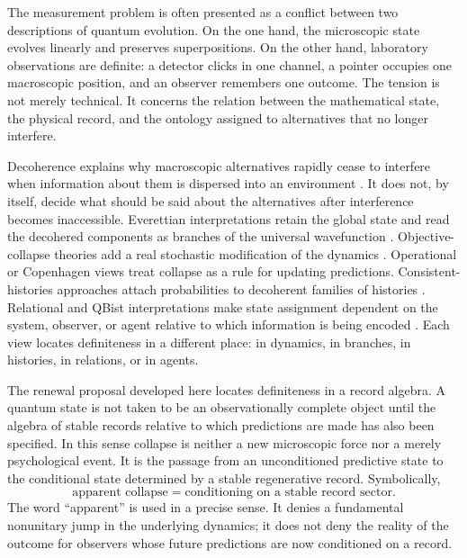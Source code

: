 \documentclass[11pt]{article}
\numberwithin{equation}{section}
\theoremstyle{definition}
\theoremstyle{remark}
\begin{document}
The measurement problem is often presented as a conflict between two descriptions of quantum evolution.  On the one hand, the microscopic state evolves linearly and preserves superpositions.  On the other hand, laboratory observations are definite: a detector clicks in one channel, a pointer occupies one macroscopic position, and an observer remembers one outcome.  The tension is not merely technical.  It concerns the relation between the mathematical state, the physical record, and the ontology assigned to alternatives that no longer interfere.

Decoherence explains why macroscopic alternatives rapidly cease to interfere when information about them is dispersed into an environment \cite{Zeh1970,Zurek1981,JoosZeh1985,Schlosshauer2007}.  It does not, by itself, decide what should be said about the alternatives after interference becomes inaccessible.  Everettian interpretations retain the global state and read the decohered components as branches of the universal wavefunction \cite{Everett1957,DeWittGraham1973,Wallace2012}.  Objective-collapse theories add a real stochastic modification of the dynamics \cite{GRW1986,Pearle1989,BassiGhirardi2003}.  Operational or Copenhagen views treat collapse as a rule for updating predictions.  Consistent-histories approaches attach probabilities to decoherent families of histories \cite{Griffiths1984,Omnes1992,GellMannHartle1993}.  Relational and QBist interpretations make state assignment dependent on the system, observer, or agent relative to which information is being encoded \cite{Rovelli1996,FuchsMerminSchack2014}.  Each view locates definiteness in a different place: in dynamics, in branches, in histories, in relations, or in agents.

The renewal proposal developed here locates definiteness in a record algebra.  A quantum state is not taken to be an observationally complete object until the algebra of stable records relative to which predictions are made has also been specified.  In this sense collapse is neither a new microscopic force nor a merely psychological event.  It is the passage from an unconditioned predictive state to the conditional state determined by a stable regenerative record.  Symbolically,
\[
  \boxed{\text{apparent collapse} = \text{conditioning on a stable record sector}.}
\]
The word ``apparent'' is used in a precise sense.  It denies a fundamental nonunitary jump in the underlying dynamics; it does not deny the reality of the outcome for observers whose future predictions are now conditioned on a record.
\end{document}
